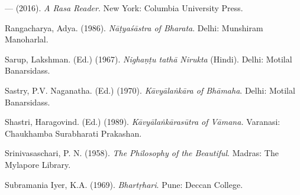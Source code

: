\begin{thebibliography}{99}
  — (2016). \textit{A Rasa Reader}. New York: Columbia University Press.

  Rangacharya, Adya. (1986). \textit{Nāṭyaśāstra of Bharata}. Delhi: Munshiram Manoharlal.

  Sarup, Lakshman. (Ed.) (1967). \textit{Nighaṇṭu tathā Nirukta} (Hindi). Delhi: Motilal Banarsidass.

  Sastry, P.V. Naganatha. (Ed.) (1970).\textit{ Kāvyālaṅkāra of Bhāmaha}. Delhi: Motilal Banarsidass.

  Shastri, Haragovind. (Ed.) (1989). \textit{Kāvyālaṅkārasūtra of Vāmana.} Varanasi: Chaukhamba Surabharati Prakashan.

  Srinivasaschari, P. N. (1958). \textit{The Philosophy of the Beautiful}. Madras: The Mylapore Library.

  Subramania Iyer, K.A. (1969). \textit{Bhartṛhari}. Pune: Deccan College.

 \end{thebibliography}

